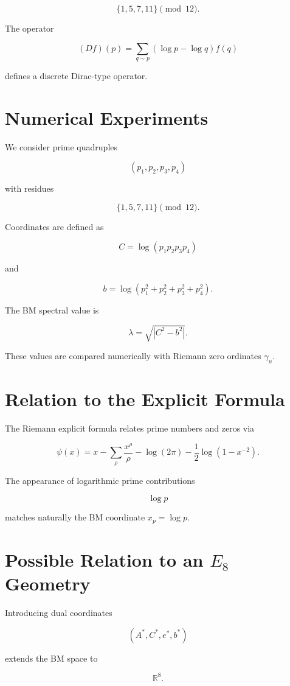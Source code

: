\documentclass[11pt,a4paper]{article}
\begin{document}
	\[
	\{1,5,7,11\}\pmod{12}.
	\]
	
	The operator
	
	\[
	(Df)(p)
	=
	\sum_{q\sim p}
	(\log p-\log q)f(q)
	\]
	
	defines a discrete Dirac-type operator.
	
	\section{Numerical Experiments}
	
	We consider prime quadruples
	
	\[
	(p_1,p_2,p_3,p_4)
	\]
	
	with residues
	
	\[
	\{1,5,7,11\}\pmod{12}.
	\]
	
	Coordinates are defined as
	
	\[
	C=\log(p_1p_2p_3p_4)
	\]
	
	and
	
	\[
	b=\log(p_1^2+p_2^2+p_3^2+p_4^2).
	\]
	
	The BM spectral value is
	
	\[
	\lambda=\sqrt{|C^2-b^2|}.
	\]
	
	These values are compared numerically with
	Riemann zero ordinates $\gamma_n$.
	
	\section{Relation to the Explicit Formula}
	
	The Riemann explicit formula relates prime
	numbers and zeros via
	
	\[
	\psi(x)
	=
	x-
	\sum_{\rho}
	\frac{x^\rho}{\rho}
	-\log(2\pi)
	-\frac12\log(1-x^{-2}).
	\]
	
	The appearance of logarithmic prime
	contributions
	
	\[
	\log p
	\]
	
	matches naturally the BM coordinate
	$x_p=\log p$.
	
	\section{Possible Relation to an $E_8$ Geometry}
	
	Introducing dual coordinates
	
	\[
	(A^*,C^*,e^*,b^*)
	\]
	
	extends the BM space to
	
	\[
	\mathbb{R}^8.
	\]
	
\end{document}
